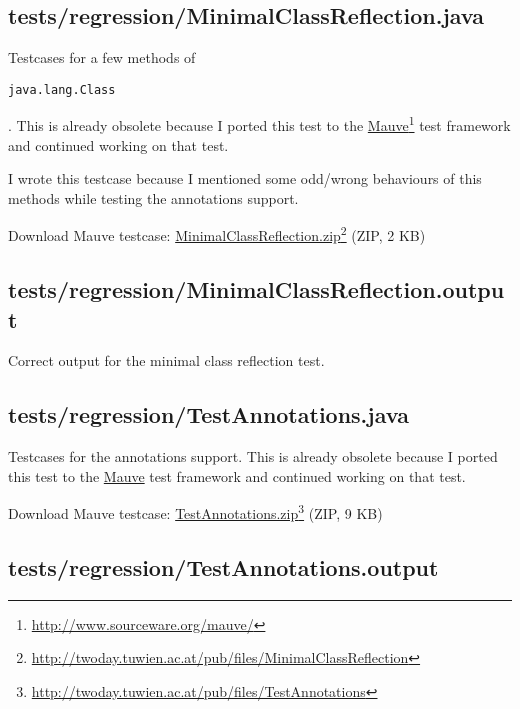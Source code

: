 \documentclass[a4paper, 10pt, titlepage]{scrartcl} %
\begin{document}
\subsection{tests/regression/MinimalClassReflection.java}
\label{sec:tests/regression/MinimalClassReflection.java}

Testcases for a few methods of \begin{scriptsize}\verb|java|\hspace{0.0pt}\verb|.|\hspace{0.0pt}\verb|lang|\hspace{0.0pt}\verb|.|\hspace{0.0pt}\verb|Class|\end{scriptsize}. This is already obsolete
because I ported this test to the \href{http://www.sourceware.org/mauve/}{Mauve}\footnote{\url{http://www.sourceware.org/mauve/}}
test framework and continued working on that test.

I wrote this testcase because I mentioned some odd/wrong behaviours of this
methods while testing the annotations support.

Download Mauve testcase: \href{http://twoday.tuwien.ac.at/pub/files/MinimalClassReflection}{MinimalClassReflection.zip}\footnote{\url{http://twoday.tuwien.ac.at/pub/files/MinimalClassReflection}} (ZIP, 2 KB)

\subsection{tests/regression/MinimalClassReflection.output}
\label{sec:tests/regression/MinimalClassReflection.output}

Correct output for the minimal class reflection test.

\subsection{tests/regression/TestAnnotations.java}
\label{sec:tests/regression/TestAnnotations.java}

Testcases for the annotations support. This is already obsolete because I
ported this test to the \href{http://www.sourceware.org/mauve/}{Mauve} test framework
and continued working on that test.

Download Mauve testcase: \href{http://twoday.tuwien.ac.at/pub/files/TestAnnotations}{TestAnnotations.zip}\footnote{\url{http://twoday.tuwien.ac.at/pub/files/TestAnnotations}} (ZIP, 9 KB)

\subsection{tests/regression/TestAnnotations.output}
\label{sec:tests/regression/TestAnnotations.output}
\end{document}
